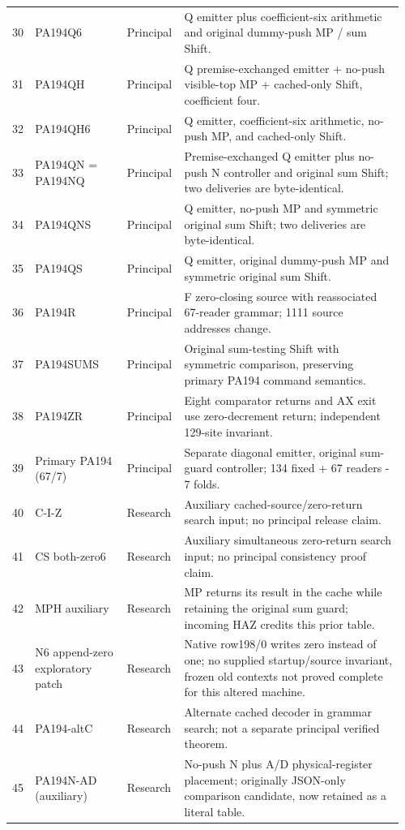 \begin{longtable}{@{}p{0.035\linewidth}p{0.235\linewidth}p{0.135\linewidth}p{0.55\linewidth}@{}}
30 & PA194Q6 & Principal & Q emitter plus coefficient-six arithmetic and original dummy-push MP / sum Shift.\\[4pt]
31 & PA194QH & Principal & Q premise-exchanged emitter + no-push visible-top MP + cached-only Shift, coefficient four.\\[4pt]
32 & PA194QH6 & Principal & Q emitter, coefficient-six arithmetic, no-push MP, and cached-only Shift.\\[4pt]
33 & PA194QN = PA194NQ & Principal & Premise-exchanged Q emitter plus no-push N controller and original sum Shift; two deliveries are byte-identical.\\[4pt]
34 & PA194QNS & Principal & Q emitter, no-push MP and symmetric original sum Shift; two deliveries are byte-identical.\\[4pt]
35 & PA194QS & Principal & Q emitter, original dummy-push MP and symmetric original sum Shift.\\[4pt]
36 & PA194R & Principal & F zero-closing source with reassociated 67-reader grammar; 1111 source addresses change.\\[4pt]
37 & PA194SUMS & Principal & Original sum-testing Shift with symmetric comparison, preserving primary PA194 command semantics.\\[4pt]
38 & PA194ZR & Principal & Eight comparator returns and AX exit use zero-decrement return; independent 129-site invariant.\\[4pt]
39 & Primary PA194 (67/7) & Principal & Separate diagonal emitter, original sum-guard controller; 134 fixed + 67 readers - 7 folds.\\[4pt]
40 & C-I-Z & Research & Auxiliary cached-source/zero-return search input; no principal release claim.\\[4pt]
41 & CS both-zero6 & Research & Auxiliary simultaneous zero-return search input; no principal consistency proof claim.\\[4pt]
42 & MPH auxiliary & Research & MP returns its result in the cache while retaining the original sum guard; incoming HAZ credits this prior table.\\[4pt]
43 & N6 append-zero exploratory patch & Research & Native row198/0 writes zero instead of one; no supplied startup/source invariant, frozen old contexts not proved complete for this altered machine.\\[4pt]
44 & PA194-altC & Research & Alternate cached decoder in grammar search; not a separate principal verified theorem.\\[4pt]
45 & PA194N-AD (auxiliary) & Research & No-push N plus A/D physical-register placement; originally JSON-only comparison candidate, now retained as a literal table.\\[4pt]

\end{longtable}
